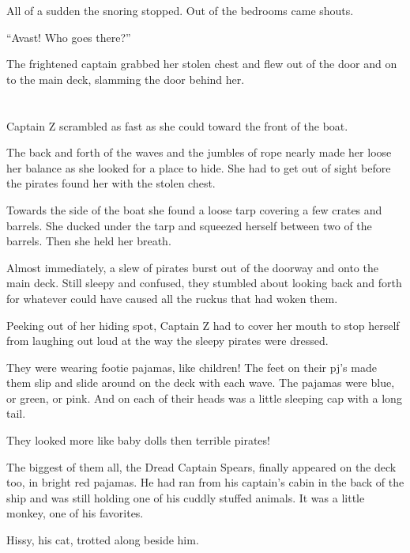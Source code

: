 \documentclass[12pt]{extbook}
\begin{document}
  All of a sudden the snoring stopped. Out of the bedrooms came shouts.
  
  \enquote{Avast! Who goes there?}
  
  The frightened captain grabbed her stolen chest and flew out of the door
  and on to the main deck, slamming the door behind her.
  
  \section{}\label{section-4}
  
  Captain Z scrambled as fast as she could toward the front of the boat.
  
  The back and forth of the waves and the jumbles of rope nearly made her
  loose her balance as she looked for a place to hide. She had to get out
  of sight before the pirates found her with the stolen chest.
  
  Towards the side of the boat she found a loose tarp covering a few
  crates and barrels. She ducked under the tarp and squeezed herself
  between two of the barrels. Then she held her breath.
  
  Almost immediately, a slew of pirates burst out of the doorway and onto
  the main deck. Still sleepy and confused, they stumbled about looking
  back and forth for whatever could have caused all the ruckus that had
  woken them.
  
  Peeking out of her hiding spot, Captain Z had to cover her mouth to stop
  herself from laughing out loud at the way the sleepy pirates were
  dressed.
  
  They were wearing footie pajamas, like children! The feet on their pj's
  made them slip and slide around on the deck with each wave. The pajamas
  were blue, or green, or pink. And on each of their heads was a little
  sleeping cap with a long tail.
  
  They looked more like baby dolls then terrible pirates!
  
  The biggest of them all, the Dread Captain Spears, finally appeared on
  the deck too, in bright red pajamas. He had ran from his captain's cabin
  in the back of the ship and was still holding one of his cuddly stuffed
  animals. It was a little monkey, one of his favorites.
  
  Hissy, his cat, trotted along beside him.
  
  \section{}\label{section-5}
  
\end{document}
